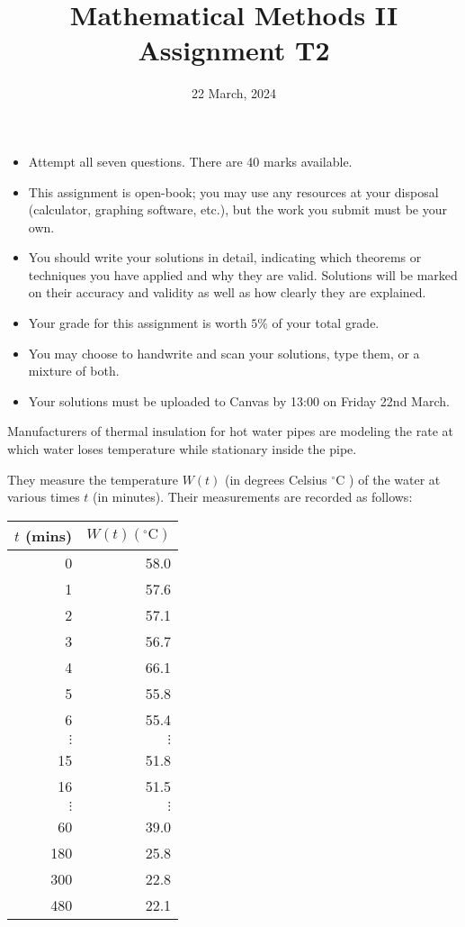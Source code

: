 \documentclass[12pt]{article}
\author{}
\title{Mathematical Methods II Assignment T2 }
\date{22 March, 2024}
\begin{document}
\maketitle
    \begin{itemize}
          \item Attempt all seven questions. There are 40 marks available.
          \item This assignment is open-book; you may use any resources at your disposal (calculator, graphing software, etc.), but the work you submit must be your own.
          \item You should write your solutions in detail, indicating which theorems or techniques you have applied and why they are valid. Solutions will be marked on their accuracy and validity as well as how clearly they are explained.
          \item Your grade for this assignment is worth $5 \%$ of your total grade.
          \item You may choose to handwrite and scan your solutions, type them, or a mixture of both.
          \item Your solutions must be uploaded to Canvas by 13:00 on Friday 22nd March.
    \end{itemize}
\newpage
    
Manufacturers of thermal insulation for hot water pipes are modeling the rate at which water loses temperature while stationary inside the pipe.

They measure the temperature $W(t)$ (in degrees Celsius ${ }^{\circ} \mathrm{C}$ ) of the water at various times $t$ (in minutes). Their measurements are recorded as follows:

\begin{center}
\begin{tabular}{|r|r|}
\hline
$t$ (mins) & $W(t)\left({ }^{\circ} \mathrm{C}\right)$ \\
\hline\hline
0 & 58.0 \\
1 & 57.6 \\
2 & 57.1 \\
3 & 56.7 \\
4 & 66.1 \\
5 & 55.8 \\
6 & 55.4 \\
$\vdots$ & $\vdots$ \\
15 & 51.8 \\
16 & 51.5 \\
$\vdots$ & $\vdots$ \\
60 & 39.0 \\
180 & 25.8 \\
300 & 22.8 \\
480 & 22.1 \\
\hline
\end{tabular}
\end{center}
\end{document}
